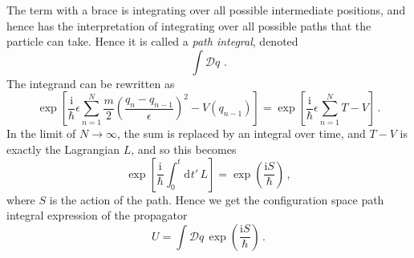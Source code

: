 \documentclass{article}
\theoremstyle{plain}\theoremheaderfont{\normalfont\itshape}\theorembodyfont{\rmfamily}\theoremseparator{.}\newtheorem*{rem}{Remark}\newtheorem*{ex}{Example}\newtheorem*{proof}{Proof}\newtheorem*{altp}{Alternative proof}
\theoremstyle{plain}\theoremheaderfont{\normalfont\bfseries}\theorembodyfont{\rmfamily}\theoremseparator{.}\newtheorem{thm}{Theorem}[section]\newtheorem{lem}[thm]{Lemma}\newtheorem{prop}[thm]{Proposition}\newtheorem*{cor}{Corollary}\newtheorem{defn}[thm]{Definition}\newtheorem{clm}[thm]{Claim}\newtheorem{clminproof}{Claim}
\theoremstyle{break}\theoremheaderfont{\normalfont\itshape}\theorembodyfont{\rmfamily}\theoremseparator{.\medskip}\newtheorem*{proofskip}{Proof}\newtheorem*{exs}{Examples}\newtheorem*{rems}{Remarks}
\theoremstyle{break}\theoremheaderfont{\normalfont\bfseries}\theorembodyfont{\rmfamily}\theoremseparator{.\medskip}\newtheorem{lemskip}[thm]{Lemma}\newtheorem{defnskip}[thm]{Definition}\newtheorem{propskip}[thm]{Proposition}\newtheorem{thmskip}[thm]{Theorem}
\numberwithin{equation}{section}
\newcommand{\ii}{\mathrm{i}}
\newcommand{\dd}[2][]{\mathrm{d}^{#1} #2\,}
\newcommand{\DD}[1]{\mathcal{D} #1\,}
\begin{document}
    The term with a brace is integrating over all possible intermediate positions, and hence has the interpretation of integrating over all possible paths that the particle can take. Hence it is called a \textit{path integral}, denoted
    \begin{equation}
        \int \DD{q}\,.
    \end{equation}
    The integrand can be rewritten as
    \begin{equation}
        \exp\left[\frac{\ii}{\hbar}\epsilon\sum_{n=1}^{N}\frac{m}{2}\left(\frac{q_n - q_{n-1}}{\epsilon}\right)^2 -V(q_{n-1})\right]=\exp\left[\frac{\ii}{\hbar}\epsilon\sum_{n=1}^{N}T-V\right]\,.
    \end{equation}
    In the limit of \(N\to\infty\), the sum is replaced by an integral over time, and \(T-V\) is exactly the Lagrangian \(L\), and so this becomes
    \begin{equation}
        \exp\left[\frac{\ii}{\hbar}\int_{0}^{t}\dd{t'}L\right]=\exp\left(\frac{\ii S}{\hbar}\right)\,,
    \end{equation}
    where \(S\) is the action of the path. Hence we get the configuration space path integral expression of the propagator
    \begin{equation}
        U=\int \DD{q} \exp\left(\frac{\ii S}{\hbar}\right)\,.
    \end{equation}
    
    
    \newpage
\end{document}
